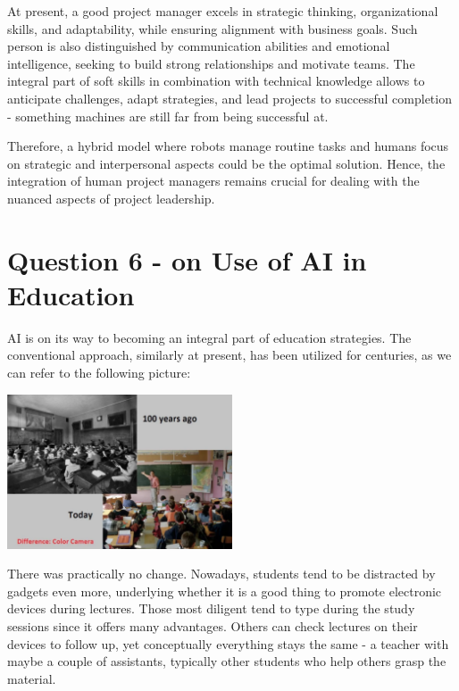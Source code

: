 \documentclass[12pt,a4paper]{article}
\begin{document}
At present, a good project manager excels in strategic thinking, organizational skills, and adaptability, while ensuring alignment with business goals. Such person is also distinguished by communication abilities and emotional intelligence, seeking to build strong relationships and motivate teams. The integral part of soft skills in combination with technical knowledge allows to anticipate challenges, adapt strategies, and lead projects to successful completion - something machines are still far from being successful at.

Therefore, a hybrid model where robots manage routine tasks and humans focus on strategic and interpersonal aspects could be the optimal solution. Hence, the integration of human project managers remains crucial for dealing with the nuanced aspects of project leadership.

\section{Question 6 - on Use of AI in Education}

AI is on its way to becoming an integral part of education strategies. The conventional approach, similarly at present, has been utilized for centuries, as we can refer to the following picture:
 
\begin{center} \includegraphics[width=0.5\textwidth]{materials/Classroom.png} \end{center}

There was practically no change. Nowadays, students tend to be distracted by gadgets even more, underlying whether it is a good thing to promote electronic devices during lectures. Those most diligent tend to type during the study sessions since it offers many advantages. Others can check lectures on their devices to follow up, yet conceptually everything stays the same - a teacher with maybe a couple of assistants, typically other students who help others grasp the material. 
\end{document}
